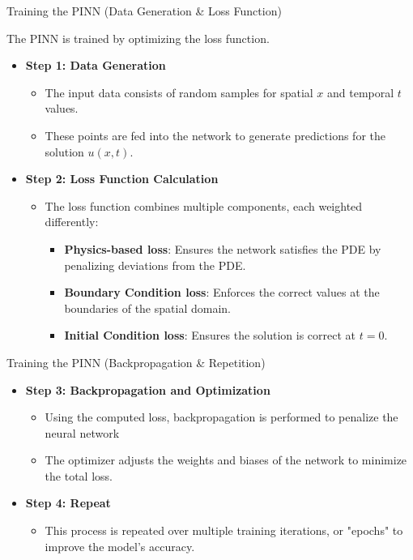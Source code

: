 \documentclass{beamer}
\begin{document}
\begin{frame}{Training the PINN (Data Generation \& Loss Function)}

The PINN is trained by optimizing the loss function.

\begin{itemize}
    \item \textbf{Step 1: Data Generation}
    \begin{itemize}
        \item The input data consists of random samples for spatial \( x \) and temporal \( t \) values.
        \item These points are fed into the network to generate predictions for the solution \( u(x, t) \).
    \end{itemize}
    
    \item \textbf{Step 2: Loss Function Calculation}
    \begin{itemize}
        \item The loss function combines multiple components, each weighted differently:
        \begin{itemize}
            \item \textbf{Physics-based loss}: Ensures the network satisfies the PDE by penalizing deviations from the PDE.
            \item \textbf{Boundary Condition loss}: Enforces the correct values at the boundaries of the spatial domain.
            \item \textbf{Initial Condition loss}: Ensures the solution is correct at \( t = 0 \).
        \end{itemize}
    \end{itemize}
\end{itemize}

\end{frame}

\begin{frame}{Training the PINN (Backpropagation \& Repetition)}

\begin{itemize}
    \item \textbf{Step 3: Backpropagation and Optimization}
    \begin{itemize}
        \item Using the computed loss, backpropagation is performed to penalize the neural network
        \item The optimizer adjusts the weights and biases of the network to minimize the total loss.
    \end{itemize}
    
    \item \textbf{Step 4: Repeat}
    \begin{itemize}
        \item This process is repeated over multiple training iterations, or "epochs"
        to improve the model’s accuracy.
    \end{itemize}
\end{itemize}

\end{frame}
\end{document}
